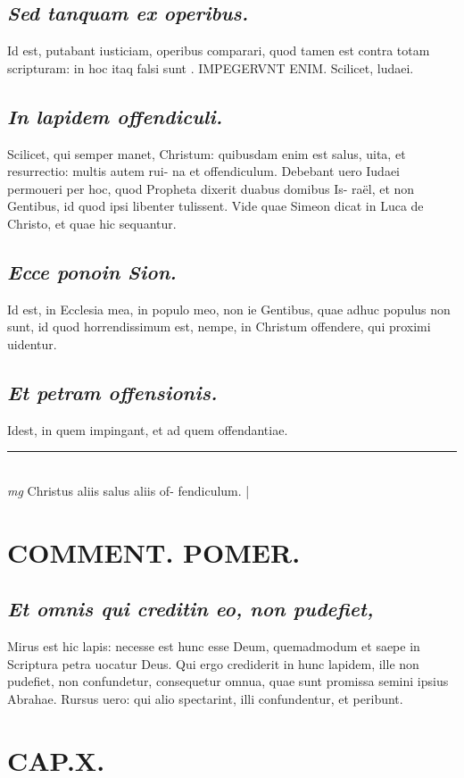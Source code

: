 \documentclass{article}
\begin{document}
\begin{pages}
\subsection*{\textit{Sed tanquam ex operibus. }}\pstart Id est, putabant iusticiam, operibus comparari, quod tamen est contra totam scripturam: in hoc itaq falsi sunt . IMPEGERVNT ENIM.  Scilicet, ludaei.   \pend
{}
{}
\subsection*{\textit{In lapidem offendiculi. }}\pstart Scilicet, qui semper manet, Christum: quibusdam enim est salus, uita, et resurrectio: multis autem rui- na et offendiculum. Debebant uero Iudaei permoueri per hoc, quod Propheta dixerit duabus domibus Is- raël, et non Gentibus, id quod ipsi libenter tulissent.  Vide quae Simeon dicat in Luca de Christo, et quae hic sequantur.   \pend
{}
{}
\subsection*{\textit{Ecce ponoin Sion. }}\pstart Id est, in Ecclesia mea, in populo meo, non ie Gentibus, quae adhuc populus non sunt, id quod horrendissimum est, nempe, in Christum offendere, qui proximi uidentur.   \pend
{}
{}
\subsection*{\textit{Et petram offensionis. }}\pstart Idest, in quem impingant, et ad quem offendantiae.  \pend
\vspace{0.5cm}\noindent
\vspace{0.2cm}\rule{1cm}{0.2pt}\\ 
\hspace{0.2cm}\textit{mg}
\footnotesize Christus aliis salus aliis of- fendiculum.  
\normalsize| 
\section*{COMMENT. POMER.  }
{}
\subsection*{\textit{Et omnis qui creditin eo, non pudefiet, }}\pstart Mirus est hic lapis: necesse est hunc esse Deum, quemadmodum et saepe in Scriptura petra uocatur Deus. Qui ergo crediderit in hunc lapidem, ille non pudefiet, non confundetur, consequetur omnua, quae sunt promissa semini ipsius Abrahae. Rursus uero: qui alio spectarint, illi confundentur, et peribunt.   \pend
\endnumbering\beginnumbering\section{CAP.X.}
{}

\end{pages}
\end{document}
